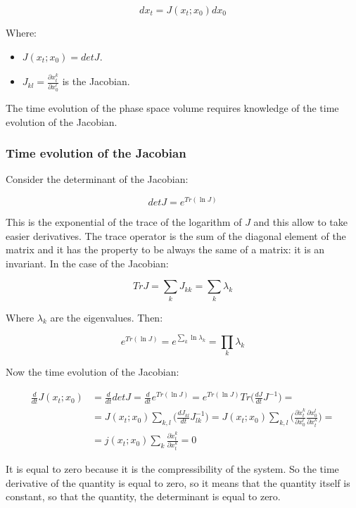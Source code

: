 	$$dx_t = J(x_t;x_0)dx_0$$

	Where:

	\begin{multicols}{2}
		\begin{itemize}
			\item $J(x_t;x_0) = det J$.
			\item $J_{kl} = \frac{\partial x_t^k}{\partial x_0^l}$ is the Jacobian.
		\end{itemize}
	\end{multicols}

	The time evolution of the phase space volume requires knowledge of the time evolution of the Jacobian.

		\subsubsection{Time evolution of the Jacobian}
		Consider the determinant of the Jacobian:

		$$det J = e^{Tr(\ln J)}$$

		This is the exponential of the trace of the logarithm of $J$ and this allow to take easier derivatives.
		The trace operator is the sum of the diagonal element of the matrix and it has the property to be always the same of a matrix: it is an invariant.
		In the case of the Jacobian:

		$$Tr J = \sum\limits_k J_{kk} = \sum\limits_k\lambda_k$$

		Where $\lambda_k$ are the eigenvalues.
		Then:

		$$e^{Tr(\ln J)} = e^{\sum\limits_k\ln\lambda_k} = \prod\limits_k\lambda_k$$

		Now the time evolution of the Jacobian:

		\begin{align*}
			\frac{d}{dt}J(x_t;x_0) &= \frac{d}{dt} det J = \frac{d}{dt}e^{Tr(\ln J)} = e^{Tr(\ln J)}Tr\biggl(\frac{dJ}{dt}J^{-1}\biggr) = \\
														 &= J(x_t;x_0)\sum\limits_{k, l}\biggl(\frac{d J_{kl}}{dt}J_{lk}^{-1}\biggr) = J(x_t;x_0)\sum\limits_{k,l}\biggl(\frac{\partial\dot{x}_t^k}{\partial x_0^l}\frac{\partial x_0^l}{\partial x_t^k}\biggr) =\\
														 &=j(x_t;x_0)\sum\limits_k\frac{\partial\dot{x}_t^k}{\partial x_t^k} = 0
		\end{align*}

		It is equal to zero because it is the compressibility of the system.
		So the time derivative of the quantity is equal to zero, so it means that the quantity itself is constant, so that the quantity, the determinant is equal to zero.

